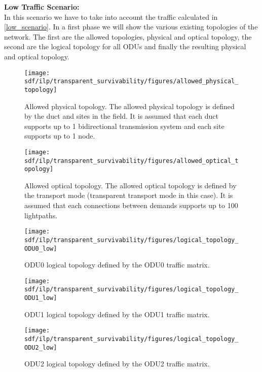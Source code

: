 \newpage
\textbf{Low Traffic Scenario:}\\

In this scenario we have to take into account the traffic calculated in \ref{low_scenario}. In a first phase we will show the various existing topologies of the network. The first are the allowed topologies, physical and optical topology, the second are the logical topology for all ODUs and finally the resulting physical and optical topology.\\

\begin{figure}[h!]
\centering
\texttt{[image: sdf/ilp/transparent\_survivability/figures/allowed\_physical\_topology]}
\caption{Allowed physical topology. The allowed physical topology is defined by the duct and sites in the field. It is assumed that each duct supports up to 1 bidirectional transmission system and each site supports up to 1 node.}
\label{allowed2_physical_low}
\end{figure}

\vspace{11pt}
\begin{figure}[h!]
\centering
\texttt{[image: sdf/ilp/transparent\_survivability/figures/allowed\_optical\_topology]}
\caption{Allowed optical topology. The allowed optical topology is defined by the transport mode (transparent transport mode in this case). It is assumed that each connections between demands supports up to 100 lightpaths.}
\label{allowed2_optical_low}
\end{figure}

\newpage
\begin{figure}[h!]
\centering
\texttt{[image: sdf/ilp/transparent\_survivability/figures/logical\_topology\_ODU0\_low]}
\caption{ODU0 logical topology defined by the ODU0 traffic matrix.}
\label{logical2_ODU0_low}
\end{figure}

\begin{figure}[h!]
\centering
\texttt{[image: sdf/ilp/transparent\_survivability/figures/logical\_topology\_ODU1\_low]}
\caption{ODU1 logical topology defined by the ODU1 traffic matrix.}
\label{logical2_ODU1_low}
\end{figure}

\begin{figure}[h!]
\centering
\texttt{[image: sdf/ilp/transparent\_survivability/figures/logical\_topology\_ODU2\_low]}
\caption{ODU2 logical topology defined by the ODU2 traffic matrix.}
\label{logical2_ODU2_low}
\end{figure}

